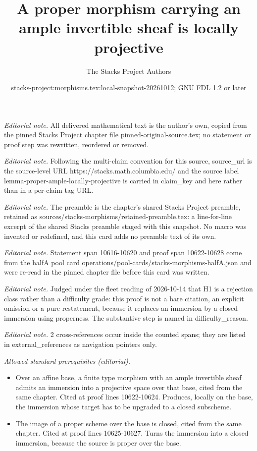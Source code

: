 \documentclass[10pt,a4paper]{amsart}
\title{A proper morphism carrying an ample invertible sheaf is locally projective}
\author{The Stacks Project Authors}
\date{stacks-project:morphisms.tex:local-snapshot-20261012; GNU FDL 1.2 or later}
\theoremstyle{plain}
\theoremstyle{definition}
\theoremstyle{remark}
\numberwithin{equation}{subsection}
\begin{document}
\maketitle
\noindent\textit{Editorial note.} All delivered mathematical text is the author's own, copied from the pinned Stacks Project chapter file pinned-original-source.tex; no statement or proof step was rewritten, reordered or removed.\par\medskip
\noindent\textit{Editorial note.} Following the multi-claim convention for this source, source\_url is the source-level URL https://stacks.math.columbia.edu/ and the source label lemma-proper-ample-locally-projective is carried in claim\_key and here rather than in a per-claim tag URL.\par\medskip
\noindent\textit{Editorial note.} The preamble is the chapter's shared Stacks Project preamble, retained as sources/stacks-morphisms/retained-preamble.tex: a line-for-line excerpt of the shared Stacks preamble staged with this snapshot. No macro was invented or redefined, and this card adds no preamble text of its own.\par\medskip
\noindent\textit{Editorial note.} Statement span 10616-10620 and proof span 10622-10628 come from the halfA pool card operations/pool-cards/stacks-morphisms-halfA.json and were re-read in the pinned chapter file before this card was written.\par\medskip
\noindent\textit{Editorial note.} Judged under the fleet reading of 2026-10-14 that H1 is a rejection class rather than a difficulty grade: this proof is not a bare citation, an explicit omission or a pure restatement, because it replaces an immersion by a closed immersion using properness. The substantive step is named in difficulty\_reason.\par\medskip
\noindent\textit{Editorial note.} 2 cross-references occur inside the counted spans; they are listed in external\_references as navigation pointers only.\par\medskip
\noindent\textit{Allowed standard prerequisites (editorial).}\begin{itemize}
\item Over an affine base, a finite type morphism with an ample invertible sheaf admits an immersion into a projective space over that base, cited from the same chapter. Cited at proof lines 10622-10624. Produces, locally on the base, the immersion whose target has to be upgraded to a closed subscheme.
\item The image of a proper scheme over the base is closed, cited from the same chapter. Cited at proof lines 10625-10627. Turns the immersion into a closed immersion, because the source is proper over the base.
\end{itemize}\medskip
\end{document}
